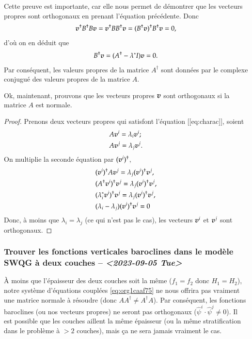 \documentclass[10pt]{article}
\numberwithin{equation}{section}
\newcommand{\vv}{\vb*{v}}
\begin{document}
Cette preuve est importante, car elle nous permet de démontrer que les vecteurs propres sont orthogonaux en prenant l'équation précédente.
Donc
\begin{equation}
   \vv^\dagger B^\dagger B \vv = \vv^\dagger BB^\dagger \vv = (B^\dagger \vv)^\dagger B^\dagger \vv = 0,
\end{equation}
d'où on en déduit que
\begin{equation}
   B^\dagger \vv = (A^\dagger -\lambda^* I ) \vv = 0.
\end{equation}
Par conséquent, les valeurs propres de la matrice \(A^\dagger\) sont données par le complexe conjugué des valeurs propres de la matrice \(A\). \bigskip

Ok, maintenant, prouvons que les vecteurs propres \(\vv\) sont orthogonaux si la matrice \(A\) est normale.
\begin{proof}
Prenons deux vecteurs propres qui satisfont l'équation [[eq:charac]], soient
\begin{subequations}
\begin{align}
   &A \vv^i = \lambda_i\vv^i;\\
   &A \vv^j = \lambda_j\vv^j.
\end{align}
\end{subequations}
On multiplie la seconde équation par $(\vv^i)^\dagger$,
\begin{align}
   & (\vv^i)^\dagger A\vv^j = \lambda_j(\vv^i)^\dagger\vv^j,\nonumber\\
   & (A^\dagger\vv^i)^\dagger\vv^j = \lambda_j(\vv^i)^\dagger\vv^j,\nonumber\\
   & (\lambda_i^*\vv^i)^\dagger\vv^j = \lambda_j(\vv^i)^\dagger\vv^j,\nonumber\\
   & (\lambda_i - \lambda_j) (\vv^i)^\dagger\vv^j = 0
\end{align}
Donc, à moins que $\lambda_i = \lambda_j$ (ce qui n'est pas le cas), les vecteurs $\vv^i$ et $\vv^j$ sont orthogonaux. \end{proof}

\subsubsection{Trouver les fonctions verticales baroclines dans le modèle SWQG à deux couches -- \textit{<2023-09-05 Tue>}}
\label{sec:org5be3d28}

À moins que l'épaisseur des deux couches soit la même (\(f_1 = f_2\) donc \(H_1 = H_2\)), notre système d'équations couplées \ref{eq:org1caaf75} ne nous offrira pas vraiment une matrice normale à résoudre (donc \(AA^\dagger\not=A^\dagger A\)).
Par conséquent, les fonctions baroclines (ou nos vecteurs propres) ne seront pas orthogonaux (\(\hat{\psi}^i \cdot \hat{\psi}^j \not= 0\)).
Il est possible que les couches aillent la même épaisseur (ou la même stratification dans le problème à \(>2\) couches), mais ça ne sera jamais vraiment le cas.\bigskip
\end{document}
